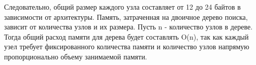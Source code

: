\documentclass[bachelor, och, referat, times]{SCWorks}
\begin{document}
Следовательно, общий размер каждого узла составляет от 12 до 24 байтов в зависимости от архитектуры.
Память, затраченная на двоичное дерево поиска, зависит от количества узлов и их размера. 
Пусть n - количество узлов в дереве.
Тогда общий расход памяти для дерева будет составлять O(n), так как
каждый узел требует фиксированного количества памяти и 
количество узлов напрямую пропорционально объему занимаемой памяти.





    \appendix
     
\end{document}
